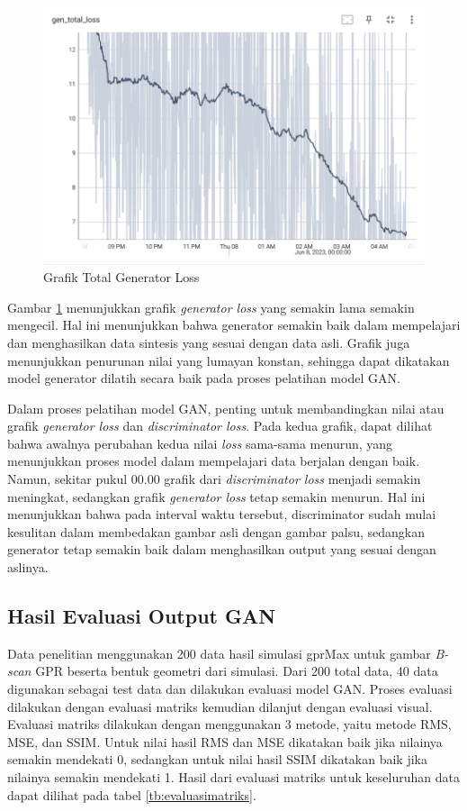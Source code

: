\documentclass[conference]{IEEEtran}
\begin{document}
\begin{figure}[ht]
  \centering
  \includegraphics[scale=0.4]{gambar/Gen_total_loss.png}
  \caption{Grafik Total Generator Loss}
  \label{fig:genLoss}
\end{figure}

Gambar \ref{fig:genLoss} menunjukkan grafik \emph{generator loss} yang semakin lama semakin mengecil. 
Hal ini menunjukkan bahwa generator semakin baik dalam mempelajari dan menghasilkan data sintesis yang sesuai dengan data asli. 
Grafik juga menunjukkan penurunan nilai yang lumayan konstan, sehingga dapat dikatakan model generator dilatih secara baik pada proses pelatihan model GAN.

Dalam proses pelatihan model GAN, penting untuk membandingkan nilai atau grafik \emph{generator loss} dan \emph{discriminator loss}. 
Pada kedua grafik, dapat dilihat bahwa awalnya perubahan kedua nilai \emph{loss} sama-sama menurun, yang menunjukkan proses model dalam mempelajari data berjalan dengan baik. 
Namun, sekitar pukul 00.00 grafik dari \emph{discriminator loss} menjadi semakin meningkat, sedangkan grafik \emph{generator loss} tetap semakin menurun. 
Hal ini menunjukkan bahwa pada interval waktu tersebut, discriminator sudah mulai kesulitan dalam membedakan gambar asli dengan gambar palsu, sedangkan generator tetap semakin baik dalam menghasilkan output yang sesuai dengan aslinya.

\subsection{Hasil Evaluasi Output GAN}

Data penelitian menggunakan 200 data hasil simulasi gprMax untuk gambar \emph{B-scan} GPR beserta bentuk geometri dari simulasi. 
Dari 200 total data, 40 data digunakan sebagai test data dan dilakukan evaluasi model GAN. 
Proses evaluasi dilakukan dengan evaluasi matriks kemudian dilanjut dengan evaluasi visual. 
Evaluasi matriks dilakukan dengan menggunakan 3 metode, yaitu metode RMS, MSE, dan SSIM. 
Untuk nilai hasil RMS dan MSE dikatakan baik jika nilainya semakin mendekati 0, sedangkan untuk nilai hasil SSIM dikatakan baik jika nilainya semakin mendekati 1. 
Hasil dari evaluasi matriks untuk keseluruhan data dapat dilihat pada tabel \ref{tb:evaluasimatriks}. 
\end{document}
